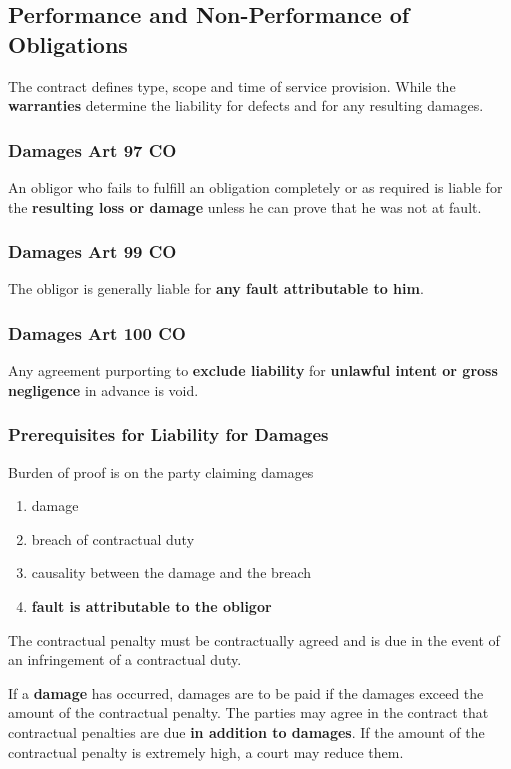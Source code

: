 \documentclass[11pt]{article}
\theoremstyle{definition}
\begin{document}
\subsection{Performance and Non-Performance of Obligations}
The contract defines type, scope and time of service provision. While the \textbf{warranties} determine the liability for defects and for any resulting damages.

\subsubsection{Damages Art 97 CO}
An obligor who fails to fulfill an obligation completely or as required is liable for the \textbf{resulting loss or damage} unless he can prove that he was not at fault.

\subsubsection{Damages Art 99 CO}
The obligor is generally liable for \textbf{any fault attributable to him}.

\subsubsection{Damages Art 100 CO}
Any agreement purporting to \textbf{exclude liability} for \textbf{unlawful intent or gross negligence} in advance is void.

\subsubsection{Prerequisites for Liability for Damages}
Burden of proof is on the party claiming damages
\begin{enumerate}
	\item damage
	\item breach of contractual duty
	\item causality between the damage and the breach
	\item \textbf{fault is attributable to the obligor}
\end{enumerate}
The contractual penalty must be contractually agreed and is due in the event of an infringement of a contractual duty.

If a \textbf{damage} has occurred, damages are to be paid if the damages exceed the amount of the contractual penalty. The parties may agree in the contract that contractual penalties are due \textbf{in addition to damages}.
If the amount of the contractual penalty is extremely high, a court may reduce them.
\end{document}
